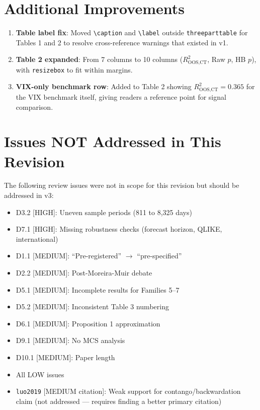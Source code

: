 \documentclass[12pt,a4paper]{article}
\begin{document}
\section{Additional Improvements}

\begin{enumerate}
    \item \textbf{Table label fix}: Moved \texttt{\textbackslash caption} and \texttt{\textbackslash label} outside \texttt{threeparttable} for Tables 1 and 2 to resolve cross-reference warnings that existed in v1.

    \item \textbf{Table 2 expanded}: From 7 columns to 10 columns ($R^2_{\text{OOS,CT}}$, Raw $p$, HB $p$), with \texttt{resizebox} to fit within margins.

    \item \textbf{VIX-only benchmark row}: Added to Table 2 showing $R^2_{\text{OOS,CT}} = 0.365$ for the VIX benchmark itself, giving readers a reference point for signal comparison.
\end{enumerate}


\section{Issues NOT Addressed in This Revision}

The following review issues were not in scope for this revision but should be addressed in v3:

\begin{itemize}
    \item D3.2 [HIGH]: Uneven sample periods (811 to 8,325 days)
    \item D7.1 [HIGH]: Missing robustness checks (forecast horizon, QLIKE, international)
    \item D1.1 [MEDIUM]: ``Pre-registered'' $\rightarrow$ ``pre-specified''
    \item D2.2 [MEDIUM]: Post-Moreira-Muir debate
    \item D5.1 [MEDIUM]: Incomplete results for Families 5--7
    \item D5.2 [MEDIUM]: Inconsistent Table 3 numbering
    \item D6.1 [MEDIUM]: Proposition 1 approximation
    \item D9.1 [MEDIUM]: No MCS analysis
    \item D10.1 [MEDIUM]: Paper length
    \item All LOW issues
    \item \texttt{luo2019} [MEDIUM citation]: Weak support for contango/backwardation claim (not addressed --- requires finding a better primary citation)
\end{itemize}
\end{document}
